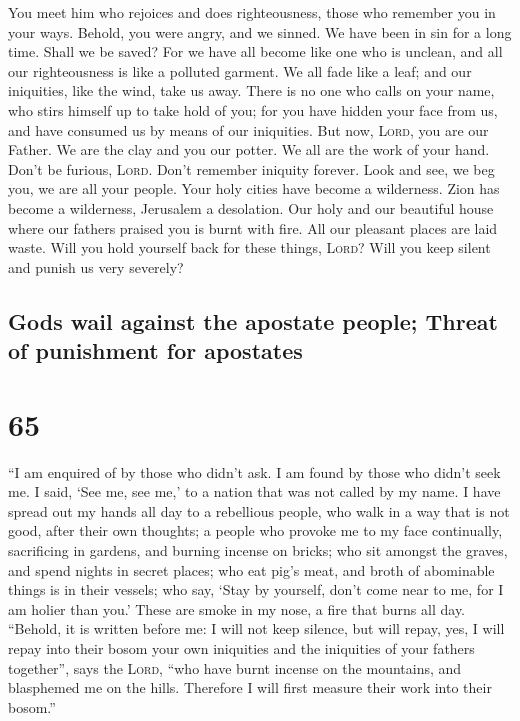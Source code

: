  You meet him who rejoices and does righteousness, those
who remember you in your ways. Behold, you were angry, and we sinned. We
have been in sin for a long time. Shall we be saved?  For
we have all become like one who is unclean, and all our righteousness is
like a polluted garment. We all fade like a leaf; and our iniquities,
like the wind, take us away.  There is no one who calls on
your name, who stirs himself up to take hold of you; for you have hidden
your face from us, and have consumed us by means of our iniquities.
 But now, \textsc{Lord}, you are our Father. We are the
clay and you our potter. We all are the work of your hand.
 Don't be furious, \textsc{Lord}. Don't remember iniquity
forever. Look and see, we beg you, we are all your people.
 Your holy cities have become a wilderness. Zion has
become a wilderness, Jerusalem a desolation.  Our holy
and our beautiful house where our fathers praised you is burnt with
fire. All our pleasant places are laid waste.  Will you
hold yourself back for these things, \textsc{Lord}? Will you keep silent
and punish us very severely?

\hypertarget{gods-wail-against-the-apostate-people-threat-of-punishment-for-apostates}{%
\subsection{Gods wail against the apostate people; Threat of punishment
for
apostates}\label{gods-wail-against-the-apostate-people-threat-of-punishment-for-apostates}}

\hypertarget{section-64}{%
\section{65}\label{section-64}}

 ``I am enquired of by those who didn't ask. I am found by
those who didn't seek me. I said, `See me, see me,' to a nation that was
not called by my name.  I have spread out my hands all day
to a rebellious people, who walk in a way that is not good, after their
own thoughts;  a people who provoke me to my face
continually, sacrificing in gardens, and burning incense on bricks;
 who sit amongst the graves, and spend nights in secret
places; who eat pig's meat, and broth of abominable things is in their
vessels;  who say, `Stay by yourself, don't come near to
me, for I am holier than you.' These are smoke in my nose, a fire that
burns all day.  ``Behold, it is written before me: I will
not keep silence, but will repay, yes, I will repay into their bosom
 your own iniquities and the iniquities of your fathers
together'', says the \textsc{Lord}, ``who have burnt incense on the
mountains, and blasphemed me on the hills. Therefore I will first
measure their work into their bosom.''

